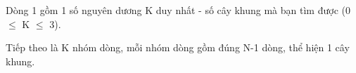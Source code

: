 Dòng 1 gồm 1 số nguyên dương K duy nhất - số cây khung mà bạn tìm được (0  $\le$  K  $\le$  3).


Tiếp theo là K nhóm dòng, mỗi nhóm dòng gồm đúng N-1 dòng, thể hiện 1 cây khung.